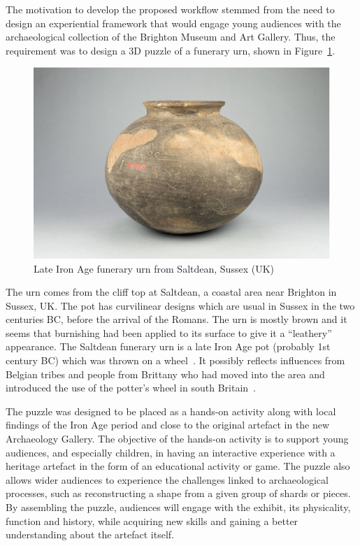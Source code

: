 \documentclass[acmlarge,screen,dvipsnames]{acmart}
\begin{document}
The motivation to develop the proposed workflow stemmed from the need
to design an experiential framework that would engage young audiences
with the archaeological collection of the Brighton Museum and Art
Gallery. Thus, the requirement was to design a 3D puzzle of a funerary
urn, shown in Figure~\ref{fig:pot}.%
%
\begin{figure}[b]
  \centering
  \includegraphics[width=0.6\linewidth]{images/pot}
  \caption{\label{fig:pot}
    Late Iron Age funerary urn from Saltdean, Sussex (UK)}
\end{figure}
%
The urn comes from the cliff top at Saltdean, a coastal area near
Brighton in Sussex, UK. The pot has curvilinear designs which are
usual in Sussex in the two centuries BC, before the arrival of the
Romans. The urn is mostly brown and it seems that burnishing had been
applied to its surface to give it a ``leathery'' appearance. The
Saltdean funerary urn is a late Iron Age pot (probably 1st century BC)
which was thrown on a wheel~\cite{Toms1912}. It possibly reflects
influences from Belgian tribes and people from Brittany who had moved
into the area and introduced the use of the potter's wheel in south
Britain~\cite{Harding1974,Cunliffe1978,Adkins1982,Cunliffe1995}.

The puzzle was designed to be placed as a hands-on activity along with
local findings of the Iron Age period and close to the original
artefact in the new Archaeology Gallery. The objective of the hands-on
activity is to support young audiences, and especially children, in
having an interactive experience with a heritage artefact in the form
of an educational activity or game. The puzzle also allows wider
audiences to experience the challenges linked to archaeological
processes, such as reconstructing a shape from a given group of shards
or pieces. By assembling the puzzle, audiences will engage with the
exhibit, its physicality, function and history, while acquiring new
skills and gaining a better understanding about the artefact itself.
\end{document}
